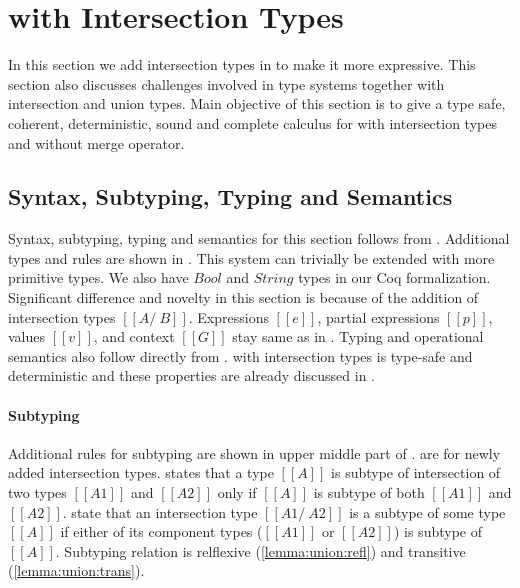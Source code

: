 \section{\cal with Intersection Types}
\label{sec:inter}
In this section we add intersection types in \cal to make it more expressive. This section also
discusses challenges involved in type systems together with intersection and union types.
Main objective of this section is to give a type safe, coherent, deterministic, sound and complete
calculus for \cal with intersection types and without merge operator.

\subsection{Syntax, Subtyping, Typing and Semantics}
\label{sec:inter:system}
Syntax, subtyping, typing and semantics for this section follows from .
Additional types and rules are shown in . This system can trivially be extended with
more primitive types. We also have $Bool$ and $String$ types in our Coq formalization.
Significant difference and novelty in this section is because of the addition of intersection types
$[[A /\ B]]$. Expressions $[[e]]$, partial expressions $[[p]]$, values $[[v]]$, and context $[[G]]$
stay same as in .
Typing and operational semantics also follow directly from .
\cal with intersection types is type-safe and deterministic and these properties are already discussed
in .

\paragraph{Subtyping}
Additional rules for subtyping are shown in upper middle part of .
 are for newly added intersection types.  states that
a type $[[A]]$ is subtype of intersection of two types $[[A1]]$ and $[[A2]]$ only if $[[A]]$ is
subtype of both $[[A1]]$ and $[[A2]]$.  state that an intersection type
$[[A1 /\ A2]]$ is a subtype of some type $[[A]]$ if either of its component types ($[[A1]]$ or $[[A2]]$)
is subtype of $[[A]]$.
Subtyping relation is relflexive (\cref{lemma:union:refl}) and transitive (\cref{lemma:union:trans}).


